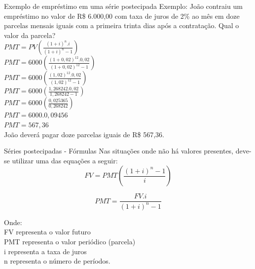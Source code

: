 \documentclass[10pt]{beamer}
\begin{document}
\begin{frame}{Exemplo de empréstimo em uma série postecipada}
\footnotesize  Exemplo: João contraiu um empréstimo no valor de R\$ 6.000,00 com taxa de juros de 2\% ao mês em doze parcelas mensais iguais com a primeira trinta dias após a contratação. Qual o valor da parcela?\\
$ PMT = PV \left( \frac{ ( 1 + i ) ^{n} .i }{ ( 1 + i ) ^{n} - 1 } \right)  $\\
$ PMT = 6000 \left( \frac{ ( 1 + 0,02 ) ^{12} .0,02 }{ ( 1 + 0,02 ) ^{12} - 1 } \right)  $\\
$ PMT = 6000 \left( \frac{ ( 1,02 ) ^{12} .0,02 }{ ( 1,02 ) ^{12} - 1 } \right)  $\\
$ PMT = 6000 \left( \frac{ 1,268242 .0,02 }{ 1,268242 - 1 } \right)  $\\
$ PMT = 6000 \left( \frac{ 0,025365 }{ 0,268242 } \right)  $\\
$ PMT = 6000 . 0,09456  $\\
$ PMT = 567,36  $\\
João deverá pagar doze parcelas iguais de R\$ 567,36.
\end{frame}

\begin{frame}{Séries postecipadas - Fórmulas}
Nas situações onde não há valores presentes, deve-se utilizar uma das equações a seguir:
  \begin{equation*}
    FV = PMT \left( \frac{ ( 1 + i ) ^{n} - 1 }{ i } \right) 
  \end{equation*}

  \begin{equation*}
    PMT =  \frac{ FV.i }{ ( 1 + i ) ^{n} - 1  } 
  \end{equation*}

\tiny Onde: \\   FV representa o valor futuro \\ PMT representa o valor periódico (parcela) \\ i representa a taxa de juros \\ n representa o número de períodos.
\end{frame}
\end{document}
